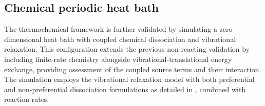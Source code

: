 

\subsection{Chemical periodic heat bath}


The thermochemical framework is further validated by simulating a zero-dimensional heat bath with coupled chemical dissociation and vibrational relaxation. This configuration extends the previous non-reacting validation by including finite-rate chemistry alongside vibrational-translational energy exchange, providing assessment of the coupled source terms and their interaction. The simulation employs the \citep{Park1993} vibrational relaxation model with both preferential and non-preferential dissociation formulations as detailed in , combined with \cite{Park1990} reaction rates.



